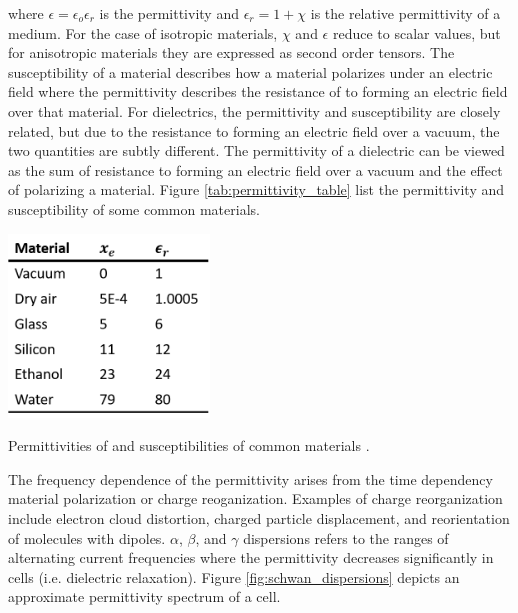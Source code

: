  \noindent where $\epsilon = \epsilon_o\epsilon_r$ is the permittivity and $\epsilon_r = 1 + \chi$ is the relative permittivity of a medium. For the case of isotropic materials, $\chi$ and $\epsilon$ reduce to scalar values, but for anisotropic materials they are expressed as second order tensors. The susceptibility of a material describes how a material polarizes under an electric field where the permittivity describes the resistance of to forming an electric field over that material. For dielectrics, the permittivity and susceptibility are closely related, but due to the resistance to forming an electric field over a vacuum, the two quantities are subtly different. The permittivity of a dielectric can be viewed as the sum of resistance to forming an electric field over a vacuum and the effect of polarizing a material.  Figure \ref{tab:permittivity_table} list the permittivity and susceptibility of some common materials.
 
 \begin{table}[h]
     \centering
     \includegraphics[width=0.4\textwidth]{images/permittivityTable.png}
     \caption[Permittivities of and susceptibilities of common materials]{Permittivities of and susceptibilities of common materials \cite{kirby_micro-and_2010}.}
     \label{tab:permittivity_table}
 \end{table}

 \par The frequency dependence of the permittivity arises from the time dependency material polarization or charge reoganization. Examples of charge reorganization include electron cloud distortion, charged particle displacement, and reorientation of molecules with dipoles. $\alpha$, $\beta$, and $\gamma$ dispersions refers to the ranges of alternating current frequencies where the permittivity decreases significantly in cells (i.e. dielectric relaxation). Figure \ref{fig:schwan_dispersions} depicts an approximate permittivity spectrum of a cell.
 
